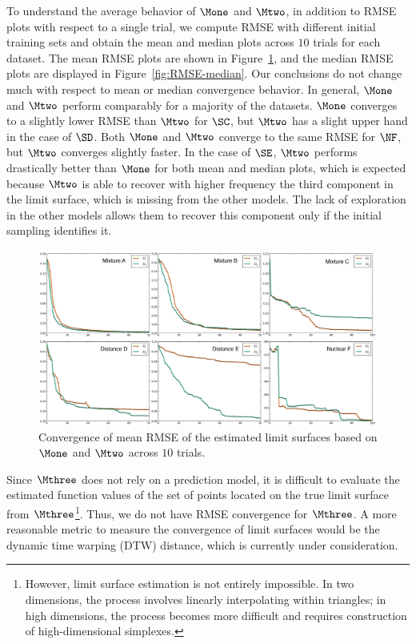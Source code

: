To understand the average behavior of $\Mone$ and $\Mtwo$, in addition to RMSE plots with respect to a single trial, we compute RMSE with different initial training sets and obtain the mean and median plots across $10$ trials for each dataset.
%
The mean RMSE plots are shown in Figure~\ref{fig:RMSE-mean}, and the median RMSE plots are displayed in Figure~\ref{fig:RMSE-median}.
%
Our conclusions do not change much with respect to mean or median convergence behavior.
%
In general, $\Mone$ and $\Mtwo$ perform comparably for a majority of the datasets.
%
$\Mone$ converges to a slightly lower RMSE than $\Mtwo$ for $\SC$, but $\Mtwo$ has a slight upper hand in the case of $\SD$.
%
Both $\Mone$ and $\Mtwo$ converge to the same RMSE for $\NF$, but $\Mtwo$ converges slightly faster.
%
In the case of $\SE$, $\Mtwo$ performs drastically better than $\Mone$ for both mean and median plots, which is expected because $\Mtwo$ is able to recover with higher frequency the third component in the limit surface, which is missing from the other models.
%
The lack of exploration in the other models allows them to recover this component only if the initial sampling identifies it.

\begin{figure}[t]
\centering
\includegraphics[width=1.0\textwidth]{figs/chap5/RMSE-mean.pdf}
\caption{Convergence of mean RMSE of the estimated limit surfaces based on $\protect\Mone$ and $\protect\Mtwo$ across $10$ trials.}
\label{fig:RMSE-mean}
\end{figure}

Since $\Mthree$ does not rely on a prediction model, it is difficult to evaluate the estimated function values of the set of points located on the true limit surface from $\Mthree$\footnote{However, limit surface estimation is not entirely impossible. In two dimensions, the process involves linearly interpolating within triangles; in high dimensions, the process becomes more difficult and requires construction of high-dimensional simplexes.}.
%
Thus, we do not have RMSE convergence for $\Mthree$.
%
A more reasonable metric to measure the convergence of limit surfaces would be the dynamic time warping (DTW) distance, which is currently under consideration.

